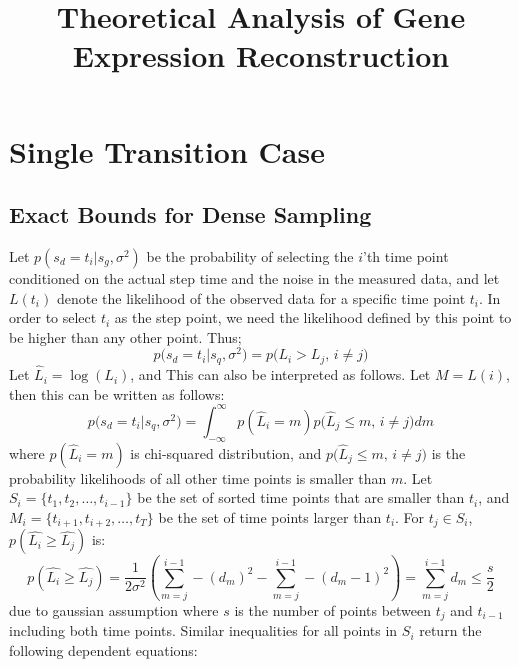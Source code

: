 \documentclass{article}
\title{Theoretical Analysis of Gene Expression Reconstruction}
\date{}
\begin{document}
\maketitle

\section{Single Transition Case}

\subsection{Exact Bounds for Dense Sampling}

Let $p(s_{d} = t_{i} | s_{g}, \sigma^{2})$ be the probability of selecting the $i$'th time point conditioned on the actual step time
and the noise in the measured data, and let $L(t_{i})$ denote the
likelihood of the observed data for a specific time point $t_{i}$. In
order to select $t_{i}$ as the step point, we need the likelihood
defined by this point to be higher than any other point. Thus;
%
\begin{equation}\label{eq:pgen}
p\big(s_{d} = t_{i} | s_{q}, \sigma^{2} \big) = p\big( L_i >L_{j}, \,
i \neq j \big ) 
\end{equation}
%
Let $\hat{L}_i = \log(L_i)$, and This can also be interpreted as follows. Let $M = L(i)$, then this can
be written as follows:
%
\begin{equation}\label{eq:pgen2}
p\big(s_{d} = t_{i} | s_{q}, \sigma^{2} \big) =
\int_{-\infty}^{\infty} p(\hat{L}_{i} = m) p\big(\hat{L}_{j} \le m, \,i \neq j \big) dm
\end{equation}
%
where $p(\hat{L}_{i} = m)$ is chi-squared distribution, and $p\big(\hat{L}_{j} \le m, \,i \neq j \big)$ is the probability
likelihoods of all other time points is smaller than $m$. Let $S_{i} =
\{t_{1}, t_{2}, \ldots, t_{i-1} \}$ be the set of sorted time points
that are smaller than $t_{i}$, and $M_{i} = \{t_{i+1}, t_{i+2},
\ldots, t_{T} \}$ be the set of time points larger than $t_{i}$. For $t_{j} \in S_{i}$, $p(\hat{L_{i}} \ge \hat{L_{j}})$ is:
%
\begin{equation}\label{eq:pgen4}
p(\hat{L_{i}} \ge \hat{L_{j}}) = \frac{1}{2\sigma^{2}} \left(
  \sum_{m=j}^{i-1} -(d_{m})^{2} - \sum_{m=j}^{i-1} -(d_{m}-1)^{2}
\right) = \sum_{m=j}^{i-1} d_{m} \le \frac{s}{2} 
\end{equation}
%
due to gaussian assumption where $s$ is the number of points between
$t_{j}$ and $t_{i-1}$ including both time points. Similar inequalities for all points in $S_{i}$ return the following dependent equations:
\end{document}
